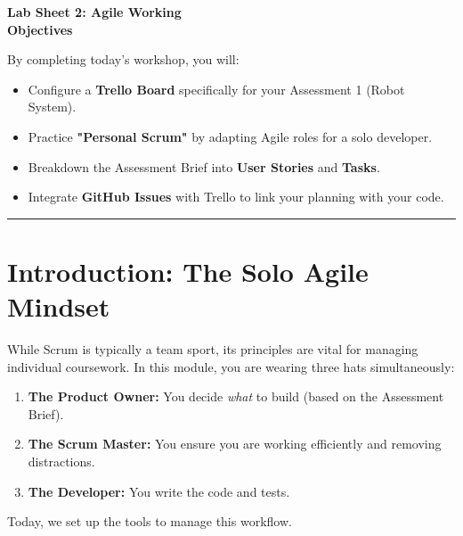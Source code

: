 \documentclass[a4paper,12pt]{article}
\begin{document}

\begin{center}
    \LARGE \textbf{Lab Sheet 2: Agile Working} \\
    \vspace{0.5cm}
    \large \textbf{Objectives}
\end{center}

\noindent By completing today's workshop, you will:
\begin{itemize}
    \item Configure a \textbf{Trello Board} specifically for your Assessment 1 (Robot System).
    \item Practice \textbf{"Personal Scrum"} by adapting Agile roles for a solo developer.
    \item Breakdown the Assessment Brief into \textbf{User Stories} and \textbf{Tasks}.
    \item Integrate \textbf{GitHub Issues} with Trello to link your planning with your code.
\end{itemize}

\vspace{0.5cm}
\hrule
\vspace{0.5cm}

\section*{Introduction: The Solo Agile Mindset}
While Scrum is typically a team sport, its principles are vital for managing individual coursework. In this module, you are wearing three hats simultaneously:
\begin{enumerate}
    \item \textbf{The Product Owner:} You decide \textit{what} to build (based on the Assessment Brief).
    \item \textbf{The Scrum Master:} You ensure you are working efficiently and removing distractions.
    \item \textbf{The Developer:} You write the code and tests.
\end{enumerate}
Today, we set up the tools to manage this workflow.

\end{document}
